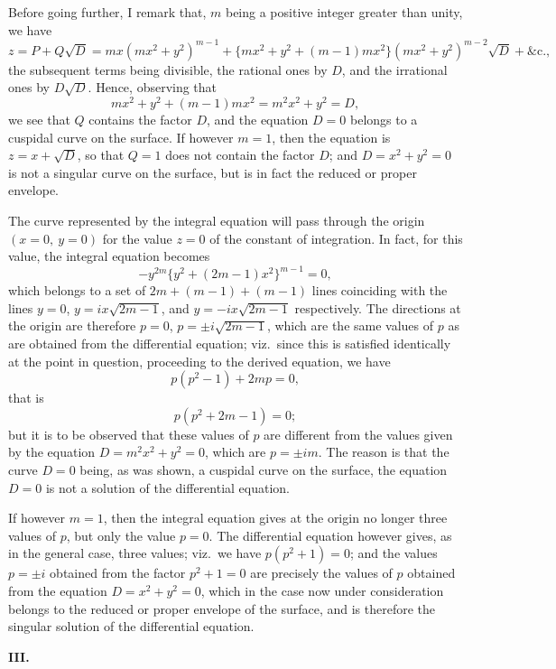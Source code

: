 \documentclass[11pt,a4paper]{article}
\begin{document}
\bigskip
\noindent Before going further, I remark that, $m$ being a positive integer greater than unity, we have
\[
z = P + Q\sqrt{D} = mx(mx^2+y^2)^{m-1} + \{mx^2+y^2+(m-1)mx^2\}(mx^2+y^2)^{m-2}\sqrt{D} + \text{\&c.},
\]
the subsequent terms being divisible, the rational ones by $D$, and the irrational ones by $D\sqrt{D}$. Hence, observing that
\[
mx^2 + y^2 + (m-1)mx^2 = m^2 x^2 + y^2 = D,
\]
we see that $Q$ contains the factor $D$, and the equation $D=0$ belongs to a cuspidal curve on the surface. If however $m=1$, then the equation is $z = x + \sqrt{D}$, so that $Q=1$ does not contain the factor $D$; and $D=x^2+y^2=0$ is not a singular curve on the surface, but is in fact the reduced or proper envelope.

The curve represented by the integral equation will pass through the origin $(x=0,\ y=0)$ for the value $z=0$ of the constant of integration. In fact, for this value, the integral equation becomes
\[
-y^{2m}\{y^2 + (2m-1)x^2\}^{m-1} = 0,
\]
which belongs to a set of $2m + (m-1) + (m-1)$ lines coinciding with the lines $y=0$, $y = ix\sqrt{2m-1}$, and $y = -ix\sqrt{2m-1}$ respectively. The directions at the origin are therefore $p=0$, $p = \pm i\sqrt{2m-1}$, which are the same values of $p$ as are obtained from the differential equation; viz.\ since this is satisfied identically at the point in question, proceeding to the derived equation, we have
\[
p(p^2-1) + 2mp = 0,
\]
that is
\[
p(p^2 + 2m - 1) = 0;
\]
but it is to be observed that these values of $p$ are different from the values given by the equation $D = m^2 x^2 + y^2 = 0$, which are $p = \pm im$. The reason is that the curve $D=0$ being, as was shown, a cuspidal curve on the surface, the equation $D=0$ is not a solution of the differential equation.

If however $m=1$, then the integral equation gives at the origin no longer three values of $p$, but only the value $p=0$. The differential equation however gives, as in the general case, three values; viz.\ we have $p(p^2+1)=0$; and the values $p = \pm i$ obtained from the factor $p^2+1=0$ are precisely the values of $p$ obtained from the equation $D=x^2+y^2=0$, which in the case now under consideration belongs to the reduced or proper envelope of the surface, and is therefore the singular solution of the differential equation.

\bigskip
\noindent \textbf{III.}

\medskip
\end{document}
